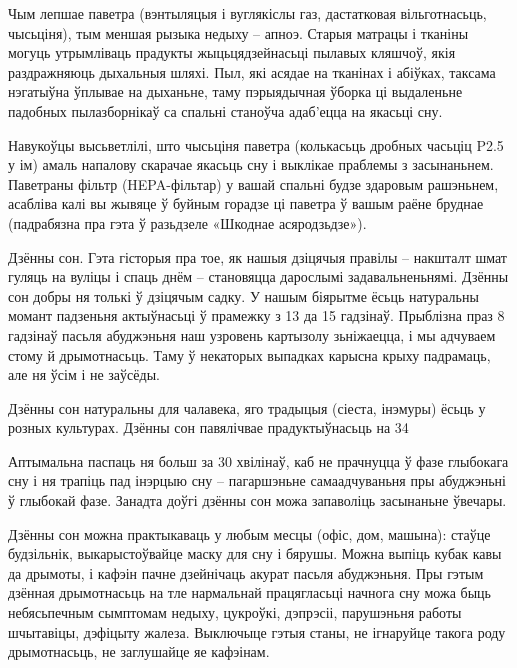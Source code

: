 Чым лепшае паветра (вэнтыляцыя і вуглякіслы газ, дастатковая вільготнасьць, чысьціня), тым меншая рызыка недыху – апноэ. Старыя матрацы і тканіны могуць утрымліваць прадукты жыцьцядзейнасьці пылавых кляшчоў, якія раздражняюць дыхальныя шляхі. Пыл, які асядае на тканінах і абіўках, таксама нэгатыўна ўплывае на дыханьне, таму пэрыядычная ўборка ці выдаленьне падобных пылазборнікаў са спальні станоўча адаб'ецца на якасьці сну.

Навукоўцы высьветлілі, што чысьціня паветра (колькасьць дробных часьціц P2.5 у ім) амаль напалову скарачае якасьць сну і выклікае праблемы з засынаньнем. Паветраны фільтр (HEPA-фільтар) у вашай спальні будзе здаровым рашэньнем, асабліва калі вы жывяце ў буйным горадзе ці паветра ў вашым раёне бруднае (падрабязна пра гэта ў разьдзеле «Шкоднае асяродзьдзе»).

Дзённы сон. Гэта гісторыя пра тое, як нашыя дзіцячыя правілы – накшталт шмат гуляць на вуліцы і спаць днём – становяцца дарослымі задавальненьнямі. Дзённы сон добры ня толькі ў дзіцячым садку. У нашым біярытме ёсьць натуральны момант падзеньня актыўнасьці ў прамежку з 13 да 15 гадзінаў. Прыблізна праз 8 гадзінаў пасьля абуджэньня наш узровень картызолу зьніжаецца, і мы адчуваем стому й дрымотнасьць. Таму ў некаторых выпадках карысна крыху падрамаць, але ня ўсім і не заўсёды.

Дзённы сон натуральны для чалавека, яго традыцыя (сіеста, інэмуры) ёсьць у розных культурах. Дзённы сон павялічвае прадуктыўнасьць на 34%

Аптымальна паспаць ня больш за 30 хвілінаў, каб не прачнуцца ў фазе глыбокага сну і ня трапіць пад інэрцыю сну – пагаршэньне самаадчуваньня пры абуджэньні ў глыбокай фазе. Занадта доўгі дзённы сон можа запаволіць засынаньне ўвечары.

Дзённы сон можна практыкаваць у любым месцы (офіс, дом, машына): стаўце будзільнік, выкарыстоўвайце маску для сну і бярушы. Можна выпіць кубак кавы да дрымоты, і кафэін пачне дзейнічаць акурат пасьля абуджэньня. Пры гэтым дзённая дрымотнасьць на тле нармальнай працягласьці начнога сну можа быць небясьпечным сымптомам недыху, цукроўкі, дэпрэсіі, парушэньня работы шчытавіцы, дэфіцыту жалеза. Выключыце гэтыя станы, не ігнаруйце такога роду дрымотнасьць, не заглушайце яе кафэінам.

